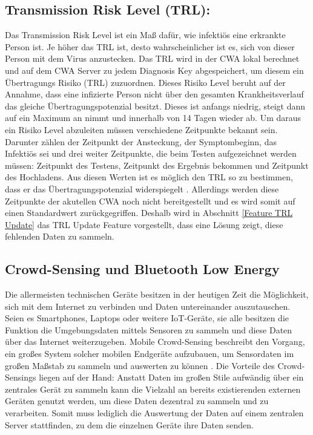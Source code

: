 \documentclass[conference,compsoc]{IEEEtran}
\begin{document}
\subsection{Transmission Risk Level (TRL):} \label{TRL}
Das Transmission Risk Level ist ein Maß dafür, wie infektiös eine erkrankte Person ist. Je höher das TRL ist, desto wahrscheinlicher ist es, sich von dieser Person mit dem Virus anzustecken.
Das TRL wird in der CWA lokal berechnet und auf dem CWA Server zu jedem Diagnosis Key abgespeichert, um diesem ein Übertragungs Risiko (TRL) zuzuordnen. 
Dieses Risiko Level beruht auf der Annahme, dass eine infizierte Person nicht über den gesamten Krankheitsverlauf das gleiche Übertragungspotenzial besitzt. 
Dieses ist anfangs niedrig, steigt dann auf ein Maximum an nimmt und innerhalb von 14 Tagen wieder ab. Um daraus ein Risiko Level abzuleiten müssen verschiedene Zeitpunkte bekannt sein. 
Darunter zählen der Zeitpunkt der Ansteckung, der Symptombeginn, das Infektiös sei und drei weiter Zeitpunkte, die beim Testen aufgezeichnet werden müssen: 
Zeitpunkt des Testens, Zeitpunkt des Ergebnis bekommen und Zeitpunkt des Hochladens. Aus diesen Werten ist es möglich den TRL so zu bestimmen, 
dass er das Übertragungspotenzial widerspiegelt \cite{CWADokuTRL}.
Allerdings werden diese Zeitpunkte der akutellen CWA noch nicht bereitgestellt und es wird somit auf einen Standardwert zurückgegriffen.
Deshalb wird in Abschnitt \ref{Feature TRL Update} das TRL Update  Feature vorgestellt, dass eine Lösung zeigt, diese fehlenden Daten zu sammeln.

\subsection{Crowd-Sensing und Bluetooth Low Energy}
Die allermeisten technischen Geräte besitzen in der heutigen Zeit die Möglichkeit, sich mit dem Internet zu verbinden und Daten untereinander auszutauschen.
Seien es Smartphones, Laptops oder weitere IoT-Geräte, sie alle besitzen die Funktion die Umgebungsdaten mittels Sensoren zu sammeln und diese Daten über das Internet weiterzugeben.
Mobile Crowd-Sensing beschreibt den Vorgang, ein großes System solcher mobilen Endgeräte aufzubauen, um Sensordaten im großen Maßstab zu sammeln und auswerten zu können \cite{MCS}.
Die Vorteile des Crowd-Sensings liegen auf der Hand: Anstatt Daten im großen Stile aufwändig über ein zentrales Gerät zu sammeln kann die Vielzahl an bereits existierenden externen Geräten genutzt werden, um diese Daten dezentral zu sammeln und zu verarbeiten.
Somit muss lediglich die Auswertung der Daten auf einem zentralen Server stattfinden, zu dem die einzelnen Geräte ihre Daten senden. 
\end{document}
